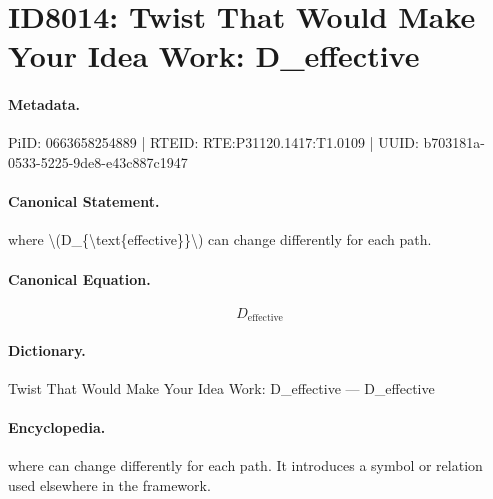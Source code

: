 \section*{ID8014: Twist That Would Make Your Idea Work: D\_effective}
\paragraph{Metadata.}
PiID: 0663658254889 | RTEID: RTE:P31120.1417:T1.0109 | UUID: b703181a-0533-5225-9de8-e43c887c1947

\paragraph{Canonical Statement.}
where \textbackslash{}(D\_\{\textbackslash{}text\{effective\}\}\textbackslash{}) can change differently for each path.

\paragraph{Canonical Equation.}
\[
D_{\text{effective}}
\]

\paragraph{Dictionary.}
Twist That Would Make Your Idea Work: D\_effective — D\_effective

\paragraph{Encyclopedia.}
where can change differently for each path. It introduces a symbol or relation used elsewhere in the framework.
